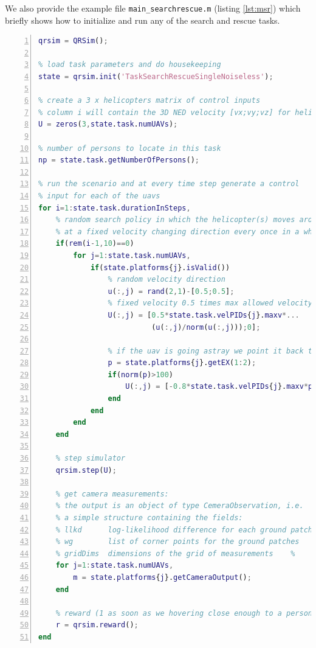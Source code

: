 \documentclass[a4paper,11pt]{report}
\begin{document}
We also provide the example file \texttt{main\_searchrescue.m} (listing \ref{lst:msr}) which briefly shows how to initialize and run any of the search and rescue tasks.
\begin{lstlisting}[float=ht!bp,caption=main\_searchrescue.m,language=Matlab,frame=lines,label=lst:msr,numbers=left,basicstyle=\small]
% create simulator object
qrsim = QRSim();

% load task parameters and do housekeeping
state = qrsim.init('TaskSearchRescueSingleNoiseless');

% create a 3 x helicopters matrix of control inputs
% column i will contain the 3D NED velocity [vx;vy;vz] for helicopter i
U = zeros(3,state.task.numUAVs);

% number of persons to locate in this task        
np = state.task.getNumberOfPersons();

% run the scenario and at every time step generate a control
% input for each of the uavs
for i=1:state.task.durationInSteps,    
    % random search policy in which the helicopter(s) moves around
    % at a fixed velocity changing direction every once in a while    
    if(rem(i-1,10)==0)
        for j=1:state.task.numUAVs,     
            if(state.platforms{j}.isValid()) 
                % random velocity direction
                u(:,j) = rand(2,1)-[0.5;0.5];
                % fixed velocity 0.5 times max allowed velocity
                U(:,j) = [0.5*state.task.velPIDs{j}.maxv*...
                          (u(:,j)/norm(u(:,j)));0];
                
                % if the uav is going astray we point it back to the center
                p = state.platforms{j}.getEX(1:2);
                if(norm(p)>100)
                    U(:,j) = [-0.8*state.task.velPIDs{j}.maxv*p/norm(p);0];
                end
            end
        end
    end
    
    % step simulator
    qrsim.step(U);
    
    % get camera measurements:
    % the output is an object of type CemeraObservation, i.e.
    % a simple structure containing the fields:
    % llkd      log-likelihood difference for each ground patch
    % wg        list of corner points for the ground patches
    % gridDims  dimensions of the grid of measurements    %
    for j=1:state.task.numUAVs,
        m = state.platforms{j}.getCameraOutput();
    end   
    
    % reward (1 as soon as we hovering close enough to a person)
    r = qrsim.reward();
end
\end{lstlisting}
\end{document}
